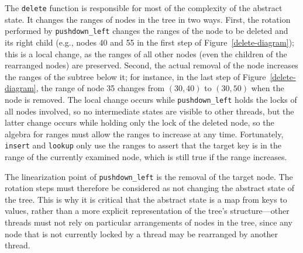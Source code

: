 \documentclass[runningheads]{llncs}
\begin{document}
The \lstinline{delete} function is responsible for most of the complexity of the abstract state. It changes the ranges of nodes in the tree in two ways. First, the rotation performed by \lstinline{pushdown_left} changes the ranges of the node to be deleted and its right child (e.g., nodes 40 and 55 in the first step of Figure~\ref{delete-diagram}); this is a local change, as the ranges of all other nodes (even the children of the rearranged nodes) are preserved. Second, the actual removal of the node increases the ranges of the subtree below it; for instance, in the last step of Figure~\ref{delete-diagram}, the range of node 35 changes from $(30, 40)$ to $(30, 50)$ when the node is removed. The local change occurs while \lstinline{pushdown_left} holds the locks of all nodes involved, so no intermediate states are visible to other threads, but the latter change occurs while holding only the lock of the deleted node, so the algebra for ranges must allow the ranges to increase at any time. Fortunately, \lstinline{insert} and \lstinline{lookup} only use the ranges to assert that the target key is in the range of the currently examined node, which is still true if the range increases.

The linearization point of \lstinline{pushdown_left} is the removal of the target node. The rotation steps must therefore be considered as not changing the abstract state of the tree. This is why it is critical that the abstract state is a map from keys to values, rather than a more explicit representation of the tree's structure---other threads must not rely on particular arrangements of nodes in the tree, since any node that is not currently locked by a thread may be rearranged by another  thread. %

\usetikzlibrary{positioning}
\end{document}
